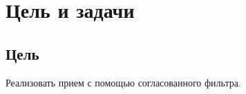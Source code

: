 \chapter*{Цель и задачи}
\label{ch:intro}

\section{Цель}
Реализовать прием с помощью согласованного фильтра.
\endinput